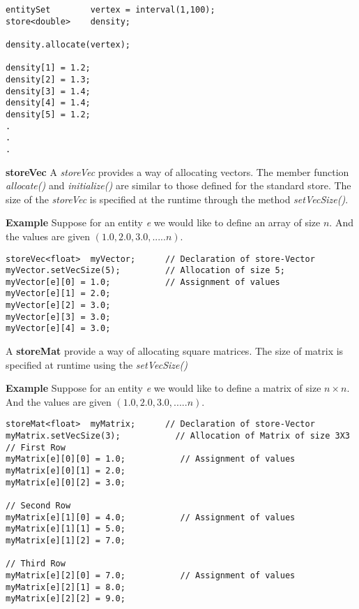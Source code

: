 \begin{verbatim}
entitySet        vertex = interval(1,100);
store<double>    density;

density.allocate(vertex);

density[1] = 1.2;
density[2] = 1.3;
density[3] = 1.4;
density[4] = 1.4;
density[5] = 1.2;
.
.
.
\end{verbatim}
\par {\bf storeVec } A {\em storeVec} provides a way of allocating vectors. The member 
function {\em allocate()} and {\em initialize()} are similar to those 
defined for the standard store. The size of the {\em storeVec} is
specified at the runtime through the method {\em setVecSize()}.
\par {\bf Example} Suppose for an entity {\em e} we would like to define an array
of size ${n}$. And the values are given $(1.0,2.0,3.0,.....n)$. 
\begin{verbatim}
storeVec<float>  myVector;      // Declaration of store-Vector
myVector.setVecSize(5);         // Allocation of size 5;
myVector[e][0] = 1.0;           // Assignment of values 
myVector[e][1] = 2.0;
myVector[e][2] = 3.0;
myVector[e][3] = 3.0;
myVector[e][4] = 3.0;
\end{verbatim}
%
\par A {\bf storeMat} provide a way of allocating square matrices. The 
size of matrix is specified at runtime using the {\em setVecSize()}
\par {\bf Example} Suppose for an entity {\em e} we would like to define a matrix
of size ${n \times n}$. And the values are given $(1.0,2.0,3.0,.....n)$. 
%
\begin{verbatim}
storeMat<float>  myMatrix;      // Declaration of store-Vector
myMatrix.setVecSize(3);           // Allocation of Matrix of size 3X3
// First Row
myMatrix[e][0][0] = 1.0;           // Assignment of values 
myMatrix[e][0][1] = 2.0;
myMatrix[e][0][2] = 3.0;

// Second Row
myMatrix[e][1][0] = 4.0;           // Assignment of values 
myMatrix[e][1][1] = 5.0;
myMatrix[e][1][2] = 7.0;

// Third Row
myMatrix[e][2][0] = 7.0;           // Assignment of values 
myMatrix[e][2][1] = 8.0;
myMatrix[e][2][2] = 9.0;
\end{verbatim}
%
%
